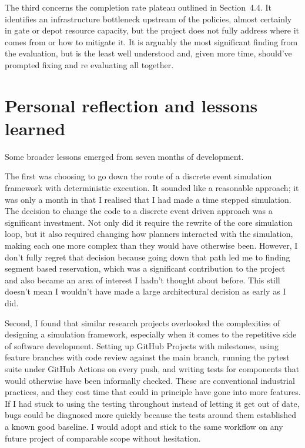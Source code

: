 \begin{appendices}
\vspace{1em}

The third concerns the completion rate plateau outlined in Section~4.4. It identifies an infrastructure bottleneck upstream of the policies, almost certainly in gate or depot resource capacity, but the project does not fully address where it comes from or how to mitigate it. It is arguably the most significant finding from the evaluation, but is the least well understood and, given more time, should've prompted fixing and re evaluating all together. 

\section{Personal reflection and lessons learned}

Some broader lessons emerged from seven months of development. \par

\vspace{1em}

The first was choosing to go down the route of a discrete event simulation framework with deterministic execution. It sounded like a reasonable approach; it was only a month in that I realised that I had made a time stepped simulation. The decision to change the code to a discrete event driven approach was a significant investment. Not only did it require the rewrite of the core simulation loop, but it also required changing how planners interacted with the simulation, making each one more complex than they would have otherwise been. However, I don't fully regret that decision because going down that path led me to finding segment based reservation, which was a significant contribution to the project and also became an area of interest I hadn't thought about before. This still doesn't mean I wouldn't have made a large architectural decision as early as I did. \par

\vspace{1em}

Second, I found that similar research projects overlooked the complexities of designing a simulation framework, especially when it comes to the repetitive side of software development. Setting up GitHub Projects with milestones, using feature branches with code review against the main branch, running the pytest suite under GitHub Actions on every push, and writing tests for components that would otherwise have been informally checked. These are conventional industrial practices, and they cost time that could in principle have gone into more features. If I had stuck to using the testing throughout instead of letting it get out of date, bugs could be diagnosed more quickly because the tests around them established a known good baseline. I would adopt and stick to the same workflow on any future project of comparable scope without hesitation.\par


\end{appendices}
